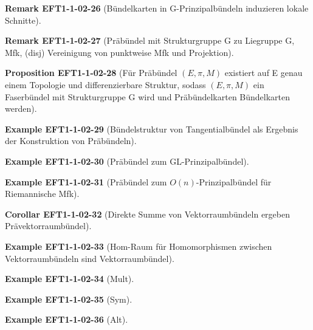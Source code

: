 \documentclass[10pt, letterpaper]{article}
\newcommand{\CustomHeading}[3]{%
  \par\medskip\noindent%
  \textbf{#1 #2} \textnormal{(#3)}.\enskip%
}
\newenvironment{PROP}[2]{\CustomHeading{Proposition}{#1}{#2}}{}
\newenvironment{KORO}[2]{\CustomHeading{Corollar}{#1}{#2}}{}
\newenvironment{REM}[2]{\CustomHeading{Remark}{#1}{#2}}{}
\newenvironment{EXA}[2]{\CustomHeading{Example}{#1}{#2}}{}
\begin{document}
\begin{REM}{EFT1-1-02-26}{Bündelkarten in G-Prinzipalbündeln induzieren lokale Schnitte}
\end{REM}

\begin{REM}{EFT1-1-02-27}{Präbündel mit Strukturgruppe G zu Liegruppe G, Mfk, (disj) Vereinigung von punktweise Mfk und Projektion}
\end{REM}

\begin{PROP}{EFT1-1-02-28}{Für Präbündel $(E,\pi,M)$ existiert auf E genau einem Topologie und differenzierbare Struktur, sodass $(E,\pi,M)$ ein Faserbündel mit Strukturgruppe G wird und Präbündelkarten Bündelkarten werden}
\end{PROP}

\begin{EXA}{EFT1-1-02-29}{Bündelstruktur von Tangentialbündel als Ergebnis der Konstruktion von Präbündeln}
\end{EXA}

\begin{EXA}{EFT1-1-02-30}{Präbündel zum GL-Prinzipalbündel}
\end{EXA}

\begin{EXA}{EFT1-1-02-31}{Präbündel zum $O(n)$-Prinzipalbündel für Riemannische Mfk}
\end{EXA}

\begin{KORO}{EFT1-1-02-32}{Direkte Summe von Vektorraumbündeln ergeben Prävektorraumbündel}
\end{KORO}

\begin{EXA}{EFT1-1-02-33}{Hom-Raum für Homomorphismen zwischen Vektorraumbündeln sind Vektorraumbündel}
\end{EXA}

\begin{EXA}{EFT1-1-02-34}{Mult}
\end{EXA}

\begin{EXA}{EFT1-1-02-35}{Sym}
\end{EXA}

\begin{EXA}{EFT1-1-02-36}{Alt}
\end{EXA}
\end{document}
